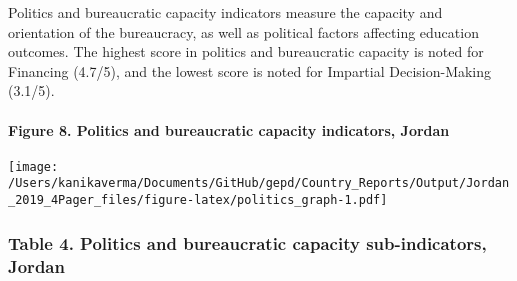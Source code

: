 \documentclass[twocolumn]{article}
\let\oldparagraph\paragraph
\renewcommand{\paragraph}[1]{\oldparagraph{#1}\mbox{}}
\begin{document}
Politics and bureaucratic capacity indicators measure the capacity and
orientation of the bureaucracy, as well as political factors affecting
education outcomes. The highest score in politics and bureaucratic
capacity is noted for Financing (4.7/5), and the lowest score is noted
for Impartial Decision-Making (3.1/5).

\hypertarget{figure-8.-politics-and-bureaucratic-capacity-indicators-jordan}{%
\paragraph{Figure 8. Politics and bureaucratic capacity indicators,
Jordan}\label{figure-8.-politics-and-bureaucratic-capacity-indicators-jordan}}

\texttt{[image: /Users/kanikaverma/Documents/GitHub/gepd/Country\_Reports/Output/Jordan\_2019\_4Pager\_files/figure-latex/politics\_graph-1.pdf]}

\hypertarget{table-4.-politics-and-bureaucratic-capacity-sub-indicators-jordan}{%
\subsubsection{Table 4. Politics and bureaucratic capacity
sub-indicators,
Jordan}\label{table-4.-politics-and-bureaucratic-capacity-sub-indicators-jordan}}
\end{document}
